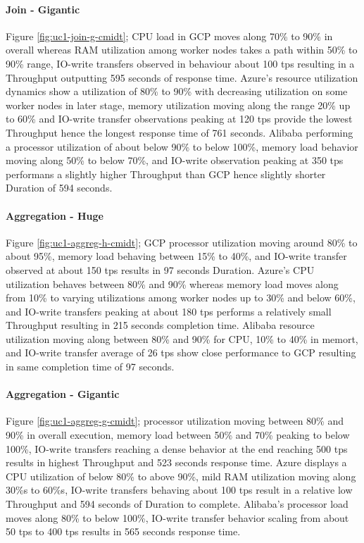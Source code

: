 \documentclass[review]{elsarticle}
\begin{document}
\paragraph{Join - Gigantic} Figure \ref{fig:uc1-join-g-cmidt}; CPU load in GCP moves along 70\% to 90\% in overall whereas RAM utilization among worker nodes takes a path within 50\% to 90\% range, IO-write transfers observed in behaviour about 100 tps resulting in a Throughput outputting 595 seconds of response time. Azure's resource utilization dynamics show a utilization of 80\% to 90\% with decreasing utilization on some worker nodes in later stage, memory utilization moving along the range 20\% up to 60\% and IO-write transfer observations peaking at 120 tps provide the lowest Throughput hence the longest response time of 761 seconds. Alibaba performing a processor utilization of about below 90\% to below 100\%, memory load behavior moving along 50\% to below 70\%, and IO-write observation peaking at 350 tps performans a slightly higher Throughput than GCP hence slightly shorter Duration of 594 seconds.

\paragraph{Aggregation - Huge} Figure \ref{fig:uc1-aggreg-h-cmidt}; GCP processor utilization moving around 80\% to about 95\%, memory load behaving between 15\% to 40\%, and IO-write transfer observed at about 150 tps results in 97 seconds Duration. Azure's CPU utilization behaves between 80\% and 90\% whereas memory load moves along from 10\% to varying utilizations among worker nodes up to 30\% and below 60\%, and IO-write transfers peaking at about 180 tps performs a relatively small Throughput resulting in 215 seconds completion time. Alibaba resource utilization moving along between 80\% and 90\% for CPU, 10\% to 40\% in memort, and IO-write transfer average of 26 tps show close performance to GCP resulting in same completion time of 97 seconds.

\paragraph{Aggregation - Gigantic} Figure \ref{fig:uc1-aggreg-g-cmidt}; processor utilization moving between 80\% and 90\% in overall execution, memory load between 50\% and 70\% peaking to below 100\%, IO-write transfers reaching a dense behavior at the end reaching 500 tps results in highest Throughput and 523 seconds response time. Azure displays a CPU utilization of below 80\% to above 90\%, mild RAM utilization moving along 30\%s to 60\%s, IO-write transfers behaving about 100 tps result in a relative low Throughput and 594 seconds of Duration to complete. Alibaba's processor load moves along 80\% to below 100\%, IO-write transfer behavior scaling from about 50 tps to 400 tps results in 565 seconds response time.	
\end{document}
